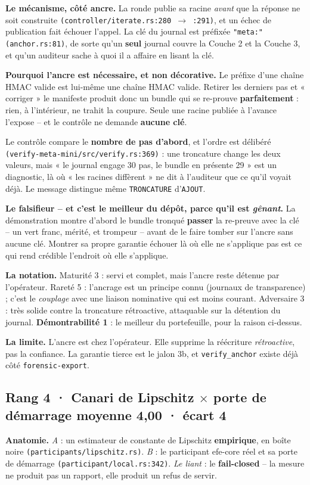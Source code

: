 \documentclass[10pt]{article}
\newcommand{\best}[1]{{\color{green}\textbf{#1}}}
\newcommand{\sz}[1]{{\small\color{grey}\textsf{#1}}}
\newcommand{\code}[1]{\texttt{\small #1}}
\newcommand{\x}{$\times$}
\newcommand{\loc}[1]{{\footnotesize\color{grey}\texttt{#1}}}
\newcommand{\couple}[4]{%
  \subsection{#1 · #2 \hfill {\normalsize\color{grey}moyenne \textbf{#3} · écart #4}}}
\begin{document}
\textbf{Le mécanisme, côté ancre.} La ronde publie sa racine \emph{avant} que la réponse ne soit
construite \loc{(controller/iterate.rs:280 $\rightarrow$ :291)}, et un échec de publication fait
échouer l'appel. La clé du journal est préfixée \code{"meta:"} \loc{(anchor.rs:81)}, de sorte qu'un
\textbf{seul} journal couvre la Couche 2 et la Couche 3, et qu'un auditeur sache à quoi il a affaire
en lisant la clé.

\textbf{Pourquoi l'ancre est nécessaire, et non décorative.} Le préfixe d'une chaîne HMAC valide est
lui-même une chaîne HMAC valide. Retirer les derniers pas et « corriger » le manifeste produit donc un
bundle qui se re-prouve \textbf{parfaitement} : rien, à l'intérieur, ne trahit la coupure. Seule une
racine publiée à l'avance l'expose -- et le contrôle ne demande \textbf{aucune clé}.

Le contrôle compare le \textbf{nombre de pas d'abord}, et l'ordre est délibéré
\loc{(verify-meta-mini/src/verify.rs:369)} : une troncature change les deux valeurs, mais « le journal
engage 30 pas, le bundle en présente 29 » est un diagnostic, là où « les racines diffèrent » ne dit à
l'auditeur que ce qu'il voyait déjà. Le message distingue même \code{TRONCATURE} d'\code{AJOUT}.

\textbf{Le falsifieur -- et c'est le meilleur du dépôt, parce qu'il est \emph{gênant}.} La
démonstration montre d'abord le bundle tronqué \textbf{passer} la re-preuve avec la clé -- un vert
franc, mérité, et trompeur -- avant de le faire tomber sur l'ancre sans aucune clé. Montrer sa propre
garantie échouer là où elle ne s'applique pas est ce qui rend crédible l'endroit où elle s'applique.

\textbf{La notation.} \sz{Maturité 3} : servi et complet, mais l'ancre reste détenue par l'opérateur.
\sz{Rareté 5} : l'ancrage est un principe connu \sz{(journaux de transparence)} ; c'est le
\emph{couplage} avec une liaison nominative qui est moins courant. \sz{Adversaire 3} : très solide
contre la troncature rétroactive, attaquable sur la détention du journal. \best{Démontrabilité 1} : le
meilleur du portefeuille, pour la raison ci-dessus.

\textbf{La limite.} L'ancre est chez l'opérateur. Elle supprime la réécriture \emph{rétroactive}, pas
la confiance. La garantie tierce est le jalon 3b, et \code{verify\_anchor} existe déjà côté
\code{forensic-export}.

\couple{Rang 4}{Canari de Lipschitz \x{} porte de démarrage}{4,00}{4}

\textbf{Anatomie.} \emph{A} : un estimateur de constante de Lipschitz \textbf{empirique}, en boîte
noire \loc{(participants/lipschitz.rs)}. \emph{B} : le participant efe-core réel et sa porte de
démarrage \loc{(participant/local.rs:342)}. \emph{Le liant} : le \textbf{fail-closed} -- la mesure ne
produit pas un rapport, elle produit un refus de servir.
\end{document}

